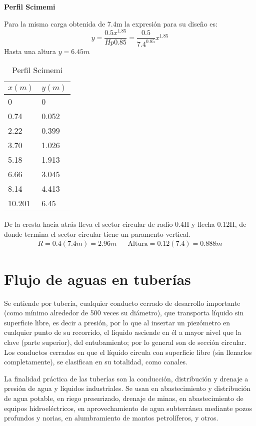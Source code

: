 \textbf{Perfil Scimemi}

Para la misma carga obtenida de 7.4m la expresión para su diseño es:
\begin{equation*}
    y = \frac{0.5x^{1.85}}{Hp{0.85}} = \frac{0.5}{7.4^{0.85}}x^{1.85}
\end{equation*}
Hasta una altura $y=6.45m$
\begin{table}[h!]
    \centering\begin{tabular}{@{}ll@{}}
    \toprule
    $x(m)$ & $y(m)$ \\ \midrule
    0      & 0      \\
    0.74   & 0.052  \\
    2.22   & 0.399  \\
    3.70   & 1.026  \\
    5.18   & 1.913  \\
    6.66   & 3.045  \\
    8.14   & 4.413  \\
    10.201 & 6.45   \\ \bottomrule
    \end{tabular}
    \caption{Perfil Scimemi}
    \label{tabhb12}
    \end{table}

De la cresta hacia atrás lleva el sector circular de radio 0.4H y flecha 0.12H, de donde termina el sector circular tiene un paramento vertical.
\begin{align*}
    R=0.4(7.4m) =2.96m&&\text{Altura}=0.12(7.4)=0.888m
\end{align*}

\section{Flujo de aguas en tuberías}

Se entiende por tubería, cualquier conducto cerrado de desarrollo importante (como mínimo alrededor de 500 veces su diámetro), que transporta líquido sin superficie libre, es decir a presión, por lo que al insertar un piezómetro en cualquier punto de su recorrido, el líquido asciende en él a mayor nivel que la clave (parte superior), del entubamiento; por lo general son de sección circular. Los conductos cerrados en que el líquido circula con superficie libre (sin llenarlos completamente), se clasifican en su totalidad, como canales.

La finalidad práctica de las tuberías son la conducción, distribución y drenaje a presión de agua y líquidos industriales. Se usan en abastecimiento y distribución de agua potable, en riego presurizado, drenaje de minas, en abastecimiento de equipos hidroeléctricos, en aprovechamiento de agua subterránea mediante pozos profundos y norias, en alumbramiento de mantos petrolíferos, y otros.


